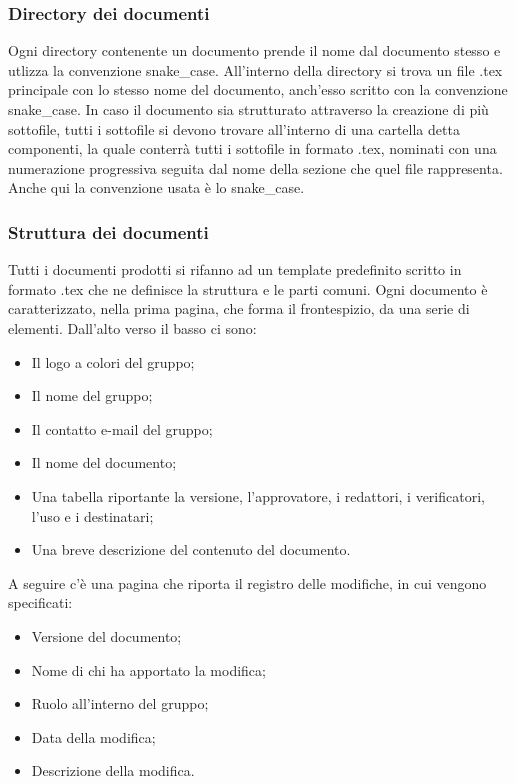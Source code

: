\documentclass[../norme-di-progetto.tex]{subfiles}
\begin{document}
\subsubsection{Directory dei documenti}
Ogni directory contenente un documento prende il nome dal documento stesso e utlizza la convenzione snake\_case. All'interno della directory si trova un file .tex principale con lo stesso nome del documento, anch'esso scritto con la convenzione snake\_case. In caso il documento sia strutturato attraverso la creazione di più sottofile, tutti i sottofile si devono trovare all'interno di una cartella detta componenti, la quale conterrà tutti i sottofile in formato .tex, nominati con una numerazione progressiva seguita dal nome della sezione che quel file rappresenta. Anche qui la convenzione usata è lo snake\_case.

\subsubsection{Struttura dei documenti}
Tutti i documenti prodotti si rifanno ad un template predefinito scritto in formato .tex che ne definisce la struttura e le parti comuni. Ogni documento è caratterizzato, nella prima pagina, che forma il frontespizio, da una serie di elementi. Dall'alto verso il basso ci sono:
\begin{itemize}
    \item Il logo a colori del gruppo;
    \item Il nome del gruppo;
    \item Il contatto e-mail del gruppo;
    \item Il nome del documento;
    \item Una tabella riportante la versione, l'approvatore, i redattori, i verificatori, l'uso e i destinatari;
    \item Una breve descrizione del contenuto del documento.
\end{itemize}
A seguire c'è una pagina che riporta il registro delle modifiche, in cui vengono specificati:
\begin{itemize}
    \item Versione del documento;
    \item Nome di chi ha apportato la modifica;
    \item Ruolo all'interno del gruppo;
    \item Data della modifica;
    \item Descrizione della modifica.
\end{itemize}
\end{document}
